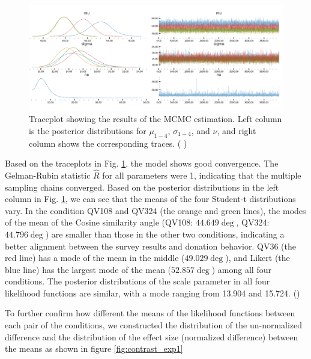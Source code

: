 \begin{figure}[htpb]
    \centering
    \includegraphics[width=\textwidth, keepaspectratio=true]{content/image/traceplot.png}
    \caption{
      Traceplot showing the results of the MCMC estimation. Left column is the posterior distributions for $\mu_{1-4}$, $\sigma_{1-4}$, and $\nu$, and right column shows the corresponding traces. ( )
    }
    \label{fig:traceplot_exp1}
\end{figure}

Based on the traceplots in Fig. \ref{fig:traceplot_exp1}, 
the model shows good convergence. 
The Gelman-Rubin statistic $\hat{R}$ for all parameters were 1, 
indicating that the multiple sampling chains converged. 
Based on the posterior distributions in the left column in Fig. \ref{fig:traceplot_exp1}, 
we can see that the means of the four Student-t distributions vary. 
In the condition QV108 and QV324 (the orange and green lines), 
the modes of the mean of the Cosine similarity angle 
(QV108: $44.649 \deg$, QV324: $44.796 \deg$) 
are smaller than those in the other two conditions, 
indicating a better alignment 
between the survey results and donation behavior. 
QV36 (the red line) 
has a mode of the mean 
in the middle ($49.029 \deg$), 
and Likert (the blue line) 
has the largest mode of the mean ($52.857 \deg$) 
among all four conditions. 
The posterior distributions of the scale parameter 
in all four likelihood functions are similar, 
with a mode ranging from 13.904 and 15.724. 
()

To further confirm how different the means 
of the likelihood functions 
between each pair of the conditions, 
we constructed the distribution 
of the un-normalized difference and 
the distribution of the effect size 
(normalized difference) 
between the means as shown in figure \ref{fig:contrast_exp1}


